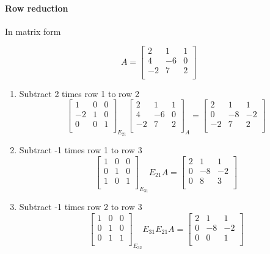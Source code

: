 \paragraph{Row reduction} In matrix form

\[
	A = \begin{bmatrix}
		2 & 1 & 1 \\
		4 & -6 & 0 \\
		-2 & 7 & 2 \\
	\end{bmatrix}
\]

\begin{enumerate}
	\item Subtract 2 times row 1 to row 2
	\[
		\begin{bmatrix}
			1 & 0 & 0 \\
			-2 & 1 & 0 \\
			0 & 0 & 1 \\
		\end{bmatrix}_{E_{21}}
		\begin{bmatrix}
			2 & 1 & 1 \\
			4 & -6 & 0 \\
			-2 & 7 & 2 \\
		\end{bmatrix}_A = 
		\begin{bmatrix}
			2 & 1 & 1 \\
			0 & -8 & -2 \\
			-2 & 7 & 2 \\
		\end{bmatrix}
	\]
	\item Subtract -1 times row 1 to row 3
	\[
		\begin{bmatrix}
			1 & 0 & 0 \\
			0 & 1 & 0 \\
			1 & 0 & 1 \\
		\end{bmatrix}_{E_{31}}
		E_{21}A = 
		\begin{bmatrix}
			2 & 1 & 1 \\
			0 & -8 & -2 \\
			0 & 8 & 3 \\
		\end{bmatrix}
	\]
	\item Subtract -1 times row 2 to row 3
	\[
		\begin{bmatrix}
			1 & 0 & 0 \\
			0 & 1 & 0 \\
			0 & 1 & 1 \\
		\end{bmatrix}_{E_{32}}
		E_{31}E_{21}A = 
		\begin{bmatrix}
			2 & 1 & 1 \\
			0 & -8 & -2 \\
			0 & 0 & 1 \\
		\end{bmatrix}
	\]
\end{enumerate}

